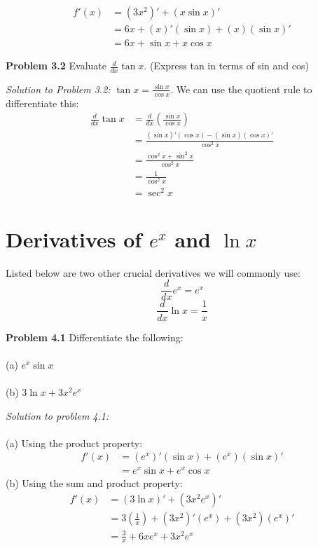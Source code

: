 \documentclass[11pt]{scrartcl}
\begin{document}
\begin{align*}
    f'(x) & = (3x^2)'+(x\sin x)'\\
          & = 6x+(x)'(\sin x)+(x)(\sin x)'\\
          & = 6x+ \sin x +x\cos x
\end{align*}
\begin{tcolorbox}
[colback=purple!5!white,colframe=purple!75!black]
\textbf{Problem 3.2} Evaluate $\frac{d}{dx} \tan x$. (Express tan in terms of sin and cos)
\end{tcolorbox}
\noindent
\textit{Solution to Problem 3.2:} $\tan x=\frac{\sin x}{\cos x}$. We can use the quotient rule to differentiate this:
\begin{align*}
    \frac{d}{dx} \tan x & = \frac{d}{dx}\left(\frac{\sin x}{\cos x}\right)\\
                        & = \frac{(\sin x)'(\cos x)-(\sin x)(\cos x)'}{\cos^2x}\\
                        & = \frac{\cos^2x+\sin^2x}{\cos^2x}\\
                        & = \frac{1}{\cos^2x}\\
                        & = \sec^2x
\end{align*}
\section{Derivatives of $e^x$ and $\ln x$} 
\noindent 
Listed below are two other crucial derivatives we will commonly use: 
$$\frac{d}{dx}e^x=e^x$$
$$\frac{d}{dx}\ln x=\frac{1}{x}$$
\noindent 
\begin{tcolorbox}
[colback=purple!5!white,colframe=purple!75!black]
\textbf{Problem 4.1}  Differentiate the following:\\
\noindent\\
(a) \;\;\;\;$e^x\sin x$\\
\noindent\\
(b) \;\;\;\;$3\ln x + 3x^2e^x$
\end{tcolorbox}
\noindent 
\textit{Solution to problem 4.1:} \\
\\
\noindent 
(a) Using the product property: 
\begin{align*}
    f'(x) &=(e^x)'(\sin x)+(e^x)(\sin x)' \\
          &=e^x \sin x +e^x \cos x
\end{align*} 
\noindent 
(b) Using the sum and product property: 
\begin{align*}
    f'(x) &= (3 \ln x)' + (3x^2e^x)' \\
          &=3\left(\frac{1}{x}\right)+(3x^2)'(e^x)+(3x^2)(e^x)' \\
          &=\frac{3}{x}+6xe^x+3x^2e^x
\end{align*}
\end{document}
